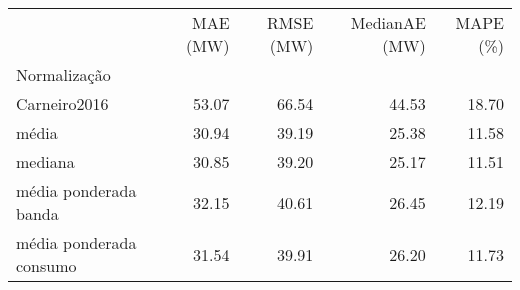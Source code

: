\begin{tabular}{lrrrr}
\toprule
 & MAE (MW) & RMSE (MW) & MedianAE (MW) & MAPE (\%)\\
Normalização &  &  &  &  \\
\midrule
Carneiro2016 & 53.07 & 66.54 & 44.53 & 18.70 \\
média & 30.94 & 39.19 & 25.38 & 11.58 \\
mediana & 30.85 & 39.20 & 25.17 & 11.51 \\
média ponderada banda & 32.15 & 40.61 & 26.45 & 12.19 \\
média ponderada consumo & 31.54 & 39.91 & 26.20 & 11.73 \\
\bottomrule
\end{tabular}
